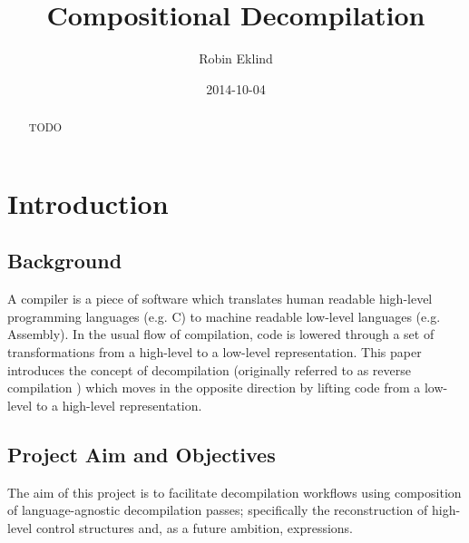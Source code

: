 \documentclass[12pt, a4paper]{article}
\title{Compositional Decompilation} %
\author{Robin Eklind}
\date{2014-10-04}
\begin{document}
\maketitle

\begin{abstract}
TODO
\end{abstract}

\pagebreak

\tableofcontents

\pagebreak



\section{Introduction}


\subsection{Background}

A compiler is a piece of software which translates human readable high-level
programming languages (e.g. C) to machine readable low-level languages (e.g.
Assembly). In the usual flow of compilation, code is lowered through a set of
transformations from a high-level to a low-level representation. This paper
introduces the concept of decompilation (originally referred to as reverse
compilation \cite{rev_comp}) which moves in the opposite direction by lifting
code from a low-level to a high-level representation.



\subsection{Project Aim and Objectives}

The aim of this project is to facilitate decompilation workflows using
composition of language-agnostic decompilation passes; specifically the
reconstruction of high-level control structures and, as a future ambition,
expressions.
\end{document}
